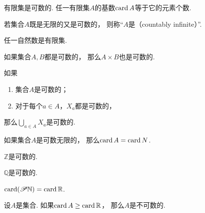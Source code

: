 \begin{proposition}
有限集是可数的.
任一有限集\(A\)的基数\(\operatorname{card} A\)等于它的元素个数.
\end{proposition}

\begin{definition}
若集合\(A\)既是无限的又是可数的，
则称“\(A\)是（countably infinite）”.
\end{definition}

\begin{example}
任一自然数是有限集.
\end{example}

\begin{proposition}
如果集合\(A,B\)都是可数的，
那么\(A \times B\)也是可数的.
\end{proposition}

\begin{proposition}
如果
\begin{enumerate}
	\item 集合\(A\)是可数的；
	\item 对于每个\(a \in A\)，\(X_a\)都是可数的，
\end{enumerate}
那么\(\bigcup_{a \in A} X_a\)是可数的.
\end{proposition}

\begin{proposition}
如果集合\(A\)是可数无限的，
那么\(\operatorname{card} A = \operatorname{card}{N}\).
\end{proposition}

\begin{corollary}
\(\mathbb{Z}\)是可数的.
\end{corollary}

\begin{corollary}
\(\mathbb{Q}\)是可数的.
\end{corollary}

\begin{proposition}
\(\operatorname{card}(\mathscr{P}\mathbb{N}) = \operatorname{card}\mathbb{R}\).
\end{proposition}

\begin{corollary}
设\(A\)是集合.
如果\(\operatorname{card} A \geq \operatorname{card}\mathbb{R}\)，
那么\(A\)是不可数的.
\end{corollary}
